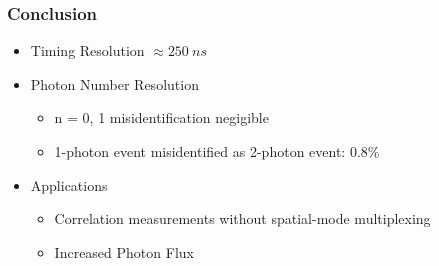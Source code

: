 \begin{frame}\frametitle{Conclusion}
  \begin{itemize}
  \item Timing Resolution $\approx 250~ns$
  \item Photon Number Resolution
  	\begin{itemize}
	  \item n = 0, 1 misidentification negigible
	  \item 1-photon event misidentified as 2-photon event: $0.8 \%$ 
	\end{itemize}
  \item Applications 
  	\begin{itemize}
  		\item Correlation measurements without spatial-mode multiplexing 
  		\item Increased Photon Flux
  	\end{itemize}
  \end{itemize}
\end{frame}